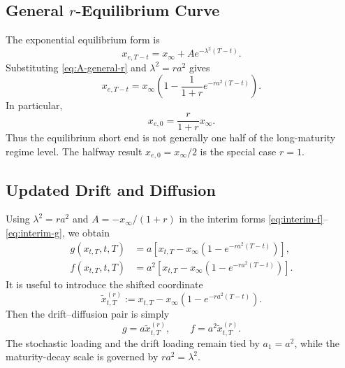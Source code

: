 \documentclass[12pt]{article}
\theoremstyle{statementstyle}
\begin{document}
\subsection{General $r$-Equilibrium Curve}
\label{subsec:reevaluate-xe}

The exponential equilibrium form is
\[
x_{e,T-t}=x_{\infty}+A e^{-\lambda^{2}(T-t)}.
\]
Substituting \eqref{eq:A-general-r} and \(\lambda^{2}=ra^{2}\) gives
\begin{equation}
x_{e,T-t}
=
x_{\infty}
\left(
1-
\frac{1}{1+r}e^{-ra^{2}(T-t)}
\right).
\tag{5.2.1}\label{eq:xe-final}
\end{equation}
In particular,
\begin{equation}
x_{e,0}=\frac{r}{1+r}x_{\infty}.
\tag{5.2.2}\label{eq:xe0-general-r}
\end{equation}
Thus the equilibrium short end is not generally one half of the
long-maturity regime level. The halfway result
\(x_{e,0}=x_{\infty}/2\) is the special case \(r=1\).

\subsection{Updated Drift and Diffusion}
\label{subsec:updated-drift-diffusion}

Using \(\lambda^{2}=ra^{2}\) and
\(A=-x_{\infty}/(1+r)\) in the interim forms
\eqref{eq:interim-f}--\eqref{eq:interim-g}, we obtain
\begin{align}
g(x_{t,T},t,T)
&=
a\left[
x_{t,T}
-
x_{\infty}\left(1-e^{-ra^{2}(T-t)}\right)
\right],
\tag{5.3.1a}\label{eq:g-updated}
\\[0.4em]
f(x_{t,T},t,T)
&=
a^{2}\left[
x_{t,T}
-
x_{\infty}\left(1-e^{-ra^{2}(T-t)}\right)
\right].
\tag{5.3.1b}\label{eq:f-updated}
\end{align}
It is useful to introduce the shifted coordinate
\begin{equation}
\widetilde{x}_{t,T}^{(r)}
:=
x_{t,T}
-
x_{\infty}\left(1-e^{-ra^{2}(T-t)}\right).
\tag{5.3.2}\label{eq:shifted-x-r}
\end{equation}
Then the drift--diffusion pair is simply
\[
g=a\widetilde{x}_{t,T}^{(r)},
\qquad
f=a^{2}\widetilde{x}_{t,T}^{(r)}.
\]
The stochastic loading and the drift loading remain tied by
\(a_{1}=a^{2}\), while the maturity-decay scale is governed by
\(ra^{2}=\lambda^{2}\).

\end{document}
